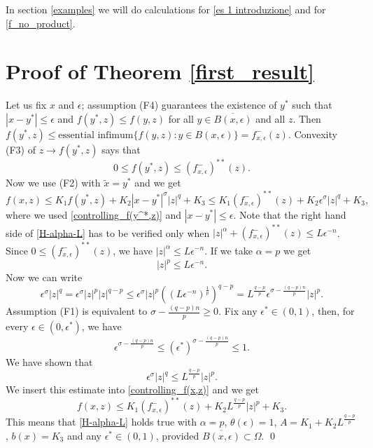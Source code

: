 \documentclass[a4paper,10pt]{article}
\theoremstyle{plain}
\theoremstyle{definition}
\numberwithin{equation}{section} \makeatletter
\begin{document}
\noindent
In section \ref{examples} we will do calculations for \eqref{es 1 introduzione} and for \eqref{f_no_product}.


\section{Proof of Theorem \ref{first_result}}\label{sec_proof_first_result}
\noindent
Let us fix $x$ and $\epsilon$; assumption (F4) guarantees the existence of $y^*$ such that $|x - y^*| \leq \epsilon$ and $f(y^*,z) \leq f(y,z)$ for all $y \in \overline{B(x,\epsilon)}$ and all $z$. Then 
$f(y^*,z) \leq \text{essential infimum}\{ f(y,z): y \in B(x,\epsilon)\}  = f^-_{x,\epsilon}(z)$. Convexity (F3) of $z \to f(y^*,z)$ says that 
\begin{equation}
  \label{controlling_f(y^*,z)}  
0 \leq f(y^*,z) \leq (f^-_{x,\epsilon})^{**}(z).
\end{equation}
Now we use (F2) with $\tilde{x} = y^*$ and we get
\begin{equation}
    \label{controlling_f(x,z)}
 f(x,z) \leq K_1 f(y^*,z)+K_2|x-y^*|^{\sigma}|z|^q+K_3 
 \leq
K_1 (f^-_{x,\epsilon})^{**}(z) + K_2 \epsilon^{\sigma} |z|^q + K_3, 
\end{equation}
where we used \eqref{controlling_f(y^*,z)} and $|x-y^*| \leq \epsilon$. Note that the right hand side of 
\eqref{H-alpha-L} has to be verified only when 
$|z|^\alpha +  (f^-_{x,\epsilon})^{**}(z) 
  \leq L \epsilon^{-n}$. Since $0 \leq (f^-_{x,\epsilon})^{**}(z)$, we have 
$|z|^\alpha \leq L \epsilon^{-n}$. If we take $\alpha = p$ we get
$$
|z|^p \leq L \epsilon^{-n}.
$$
Now we can write 
$$
\epsilon^\sigma |z|^q = \epsilon^\sigma |z|^{p} |z|^{q-p} \leq \epsilon^\sigma |z|^{p} ((L \epsilon^{-n})^\frac{1}{p})^{q-p} = L^{\frac{q-p}{p}} \epsilon^{\sigma - \frac{(q-p)n}{p}} |z|^p.
$$
Assumption (F1) is equivalent to $\sigma - \frac{(q-p)n}{p} \geq 0$. Fix any $\epsilon^* \in (0,1)$, then, for every $\epsilon \in (0, \epsilon^*)$, we have 
$$
\epsilon^{\sigma - \frac{(q-p)n}{p}} \leq 
(\epsilon^*)^{\sigma - \frac{(q-p)n}{p}}
\leq 1.
$$
We have shown that
$$
\epsilon^\sigma |z|^q \leq L^{\frac{q-p}{p}} |z|^p.
$$
We insert this estimate into \eqref{controlling_f(x,z)} and we get
\begin{equation}
    \label{controlling_f(x,z)_bis}
 f(x,z) 
 \leq
K_1 (f^-_{x,\epsilon})^{**}(z) + K_2 L^{\frac{q-p}{p}} |z|^p + K_3. 
\end{equation}
This means that \eqref{H-alpha-L} holds true with $\alpha = p$, $\theta(\epsilon) = 1$, $A=K_1 + K_2 L^{\frac{q-p}{p}}$, $b(x) = K_3$ and any $\epsilon^* \in (0,1)$, provided $\overline{B(x,\epsilon)} \subset \Omega$.
\qed
\end{document}
